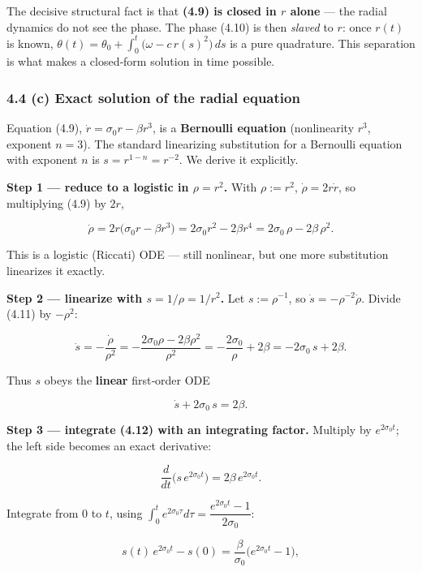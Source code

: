 \documentclass[
  11pt,
]{article}
\begin{document}
The decisive structural fact is that \textbf{(4.9) is closed in \(r\)
alone} --- the radial dynamics do not see the phase. The phase (4.10) is
then \emph{slaved} to \(r\): once \(r(t)\) is known,
\(\theta(t)=\theta_0+\int_0^t\big(\omega-c\,r(s)^2\big)\,ds\) is a pure
quadrature. This separation is what makes a closed‑form solution in time
possible.

\subsubsection{4.4 (c) Exact solution of the radial
equation}\label{c-exact-solution-of-the-radial-equation}

Equation (4.9), \(\dot r=\sigma_0 r-\beta r^3\), is a \textbf{Bernoulli
equation} (nonlinearity \(r^3\), exponent \(n=3\)). The standard
linearizing substitution for a Bernoulli equation with exponent \(n\) is
\(s=r^{1-n}=r^{-2}\). We derive it explicitly.

\textbf{Step 1 --- reduce to a logistic in \(\rho=r^2\).} With
\(\rho:=r^2\), \(\dot\rho=2r\dot r\), so multiplying (4.9) by \(2r\),

\[
\dot\rho=2r\big(\sigma_0 r-\beta r^3\big)=2\sigma_0 r^2-2\beta r^4
=2\sigma_0\,\rho-2\beta\,\rho^{2}.
\tag{4.11}
\]

This is a logistic (Riccati) ODE --- still nonlinear, but one more
substitution linearizes it exactly.

\textbf{Step 2 --- linearize with \(s=1/\rho=1/r^2\).} Let
\(s:=\rho^{-1}\), so \(\dot s=-\rho^{-2}\dot\rho\). Divide (4.11) by
\(-\rho^2\):

\[
\dot s=-\frac{\dot\rho}{\rho^{2}}
=-\frac{2\sigma_0\rho-2\beta\rho^{2}}{\rho^{2}}
=-\frac{2\sigma_0}{\rho}+2\beta
=-2\sigma_0\,s+2\beta .
\]

Thus \(s\) obeys the \textbf{linear} first‑order ODE

\[
\dot s+2\sigma_0\,s=2\beta .
\tag{4.12}
\]

\textbf{Step 3 --- integrate (4.12) with an integrating factor.}
Multiply by \(e^{2\sigma_0 t}\); the left side becomes an exact
derivative:

\[
\frac{d}{dt}\!\big(s\,e^{2\sigma_0 t}\big)=2\beta\,e^{2\sigma_0 t}.
\]

Integrate from \(0\) to \(t\), using
\(\int_0^t e^{2\sigma_0 \tau}d\tau=\dfrac{e^{2\sigma_0 t}-1}{2\sigma_0}\):

\[
s(t)\,e^{2\sigma_0 t}-s(0)=\frac{\beta}{\sigma_0}\big(e^{2\sigma_0 t}-1\big),
\]
\end{document}
